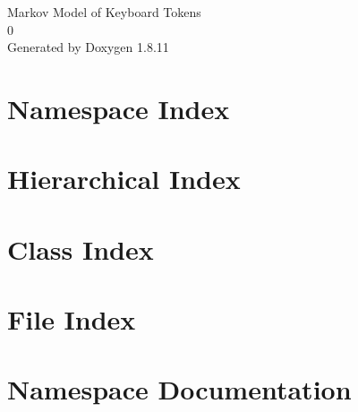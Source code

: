 \documentclass[twoside]{book}
\newcommand{\+}{\discretionary{\mbox{\scriptsize$\hookleftarrow$}}{}{}}
\newcommand{\clearemptydoublepage}{%
  \newpage{\pagestyle{empty}\cleardoublepage}%
}
\begin{document}
\hypersetup{pageanchor=false,
             bookmarksnumbered=true,
             pdfencoding=unicode
            }
\begin{titlepage}
\vspace*{7cm}
\begin{center}%
{\Large Markov Model of Keyboard Tokens \\[1ex]\large 0 }\\
\vspace*{1cm}
{\large Generated by Doxygen 1.8.11}\\
\end{center}
\end{titlepage}
\clearemptydoublepage
\tableofcontents
\clearemptydoublepage
{}
\hypersetup{pageanchor=true}

\chapter{Namespace Index}

\chapter{Hierarchical Index}

\chapter{Class Index}

\chapter{File Index}

\chapter{Namespace Documentation}








\end{document}
